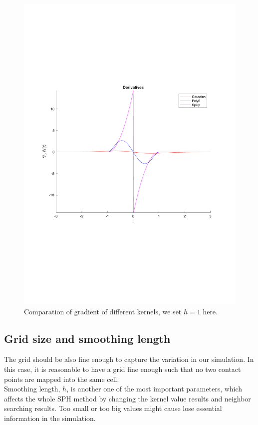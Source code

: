     \begin{figure}[!ht]
        \centering
        \includegraphics[scale = 0.5]{Figures/kenels_de}
        \caption{Comparation of gradient of different kernels, we set $h = 1$ here. }
        \label{fg:gradient}
    \end{figure}

    \subsection{Grid size and smoothing length}
    \label{gs}
    The grid should be also fine enough to capture the variation in our simulation. In this case, it is reasonable to have a grid fine enough such that no two contact points are mapped into the same cell. \\

    Smoothing length, $h$, is another one of the most important parameters, which affects the whole SPH method by changing the kernel value results and neighbor searching results. Too small or too big values might cause lose essential information in the simulation.

